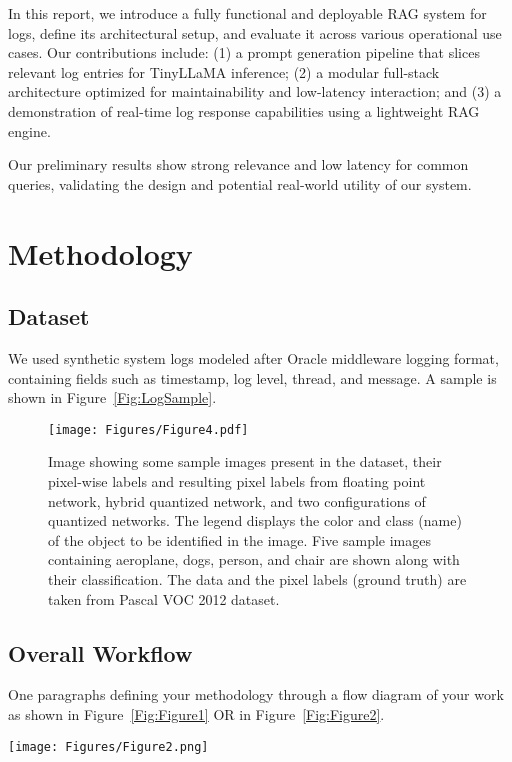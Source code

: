 \documentclass[conference]{IEEEtran}
\begin{document}
In this report, we introduce a fully functional and deployable RAG system for logs, define its architectural setup, and evaluate it across various operational use cases. Our contributions include: (1) a prompt generation pipeline that slices relevant log entries for TinyLLaMA inference; (2) a modular full-stack architecture optimized for maintainability and low-latency interaction; and (3) a demonstration of real-time log response capabilities using a lightweight RAG engine.

Our preliminary results show strong relevance and low latency for common queries, validating the design and potential real-world utility of our system.

\section{Methodology}
\subsection{Dataset}
We used synthetic system logs modeled after Oracle middleware logging format, containing fields such as timestamp, log level, thread, and message. A sample is shown in Figure~\ref{Fig:LogSample}.

\begin{figure}[!ht]
\centering
 \texttt{[image: Figures/Figure4.pdf]}
\caption{Image showing some sample images present in the dataset, their pixel-wise labels and resulting pixel labels from floating point network, hybrid quantized network, and two configurations of quantized networks. The legend displays the color and class (name) of the object to be identified in the image. Five sample images containing aeroplane, dogs, person, and chair are shown along with their classification. The data and the pixel labels (ground truth) are taken from Pascal VOC 2012 dataset.}
\label{Fig:Figure4}
\end{figure}

\subsection{Overall Workflow}
One paragraphs defining your methodology through a flow diagram of your work as shown in Figure~\ref{Fig:Figure1} OR in Figure~\ref{Fig:Figure2}.

\begin{figure*}[!ht]
\centering
\texttt{[image: Figures/Figure2.png]}
\caption{Figure showing the flowchart proposed for FCN-8 quantization and the comparison pipeline followed (for quantization techniques, i.e., Direct Quantization, Llyod's Quantizer and $L_2$ error minimization) in the current study based on pixel accuracy, mean IOU, and mean accuracy.}
\label{Fig:Figure2}
\end{figure*}
\end{document}
